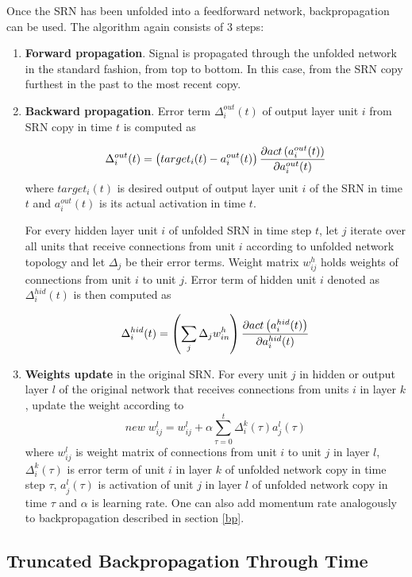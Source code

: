 \documentclass[12pt,oneside]{fithesis2}
\begin{document}
Once the SRN has been unfolded into a feedforward network, backpropagation can be used. The algorithm again consists of 3 steps:
\begin{enumerate}
  \item \textbf{Forward propagation}. Signal is propagated through the unfolded network in the standard fashion, from top to bottom. In this case, from the SRN copy furthest in the past to the most recent copy.
  \item \textbf{Backward propagation}. Error term $\Delta^{out}_{i}(t)$ of output layer unit $i$ from SRN copy in time $t$ is computed as
 
  $$\Delta^{out}_{i}(t) = \left(target_{i}(t) - a^{out}_{i}(t)\right) {{\partial{act\left(a^{out}_{i}(t)\right)}} \over {\partial a^{out}_{i}(t)}}$$
 where $target_i(t)$ is desired output of output layer unit $i$ of the SRN in time $t$ and $a^{out}_{i}(t)$ is its actual activation in time $t$.
 
  For every hidden layer unit $i$ of unfolded SRN in time step $t$, let $j$ iterate over all units that receive connections from unit $i$ according to unfolded network topology and let $\Delta_j$ be their error terms. Weight matrix $w_{ij}^h$ holds weights of connections from unit $i$ to unit $j$. Error term of hidden unit $i$ denoted as $\Delta^{hid}_{i}(t)$ is then computed as

  $$\Delta^{hid}_{i}(t) =\left(\sum\limits_{j} \Delta_{j}w_{in}^{h}\right) {{\partial{act\left(a^{hid}_{i}(t)\right)}} \over {\partial a^{hid}_{i}(t)}}$$
  
  \item \textbf{Weights update} in the original SRN. For every unit $j$ in hidden or output layer $l$ of the original network that receives connections from units $i$ in layer $k$, update the weight according to
  $$new \; w_{ij}^l = w_{ij}^l + \alpha \sum\limits_{\tau=0}^{t} \Delta_i^{k}\left(\tau\right) a_{j}^{l}\left(\tau\right)$$
where $w_{ij}^l$ is weight matrix of connections from unit $i$ to unit $j$ in layer $l$, $\Delta_i^{k}(\tau)$ is error term of unit $i$ in layer $k$ of unfolded network copy in time step $\tau$, $a_{j}^{l}(\tau)$ is activation of unit $j$ in layer $l$ of unfolded network copy in time $\tau$ and $\alpha$ is learning rate. One can also add momentum rate analogously to backpropagation described in section \ref{bp}.
\end{enumerate}

\subsection{Truncated Backpropagation Through Time}
\end{document}
